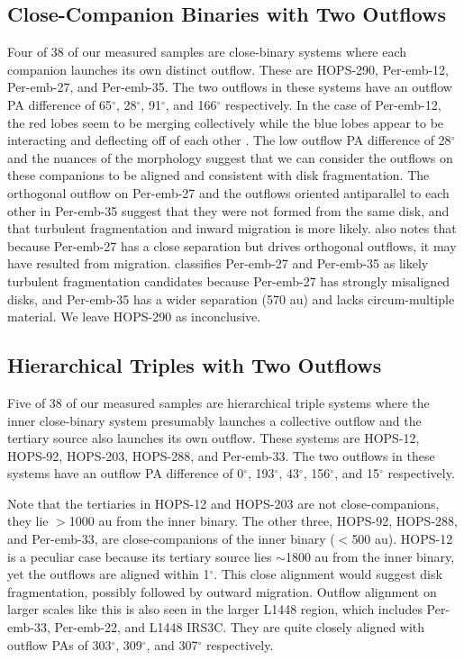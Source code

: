\documentclass[linenumbers,twocolumn, twocolappendix]{aastex631}
\begin{document}
\subsection{Close-Companion Binaries with Two Outflows} \label{sec:dis:binaries-two-outflows}
Four of 38 of our measured samples are close-binary systems where each companion launches its own distinct outflow. These are HOPS-290, Per-emb-12, Per-emb-27, and Per-emb-35. The two outflows in these systems have an outflow PA difference of 65$^\circ$, 28$^\circ$, 91$^\circ$, and 166$^\circ$ respectively. In the case of Per-emb-12, the red lobes seem to be merging collectively while the blue lobes appear to be interacting and deflecting off of each other \citep[e.g.,][]{Encalada_2024}. The low outflow PA difference of 28$^\circ$ and the nuances of the morphology suggest that we can consider the outflows on these companions to be aligned and consistent with disk fragmentation. The orthogonal outflow on Per-emb-27 and the outflows oriented antiparallel to each other in Per-emb-35 suggest that they were not formed from the same disk, and that turbulent fragmentation and inward migration is more likely. \cite{Tobin_et_al_2016} also notes that because Per-emb-27 has a close separation but drives orthogonal outflows, it may have resulted from migration. \cite{Reynolds_et_al_2024} classifies Per-emb-27 and Per-emb-35 as likely turbulent fragmentation candidates because Per-emb-27 has strongly misaligned disks, and Per-emb-35 has a wider separation (570 au) and lacks circum-multiple material. We leave HOPS-290 as inconclusive.

\subsection{Hierarchical Triples with Two Outflows} \label{sec:dis:hierarchical-triples}
Five of 38 of our measured samples are hierarchical triple systems where the inner close-binary system presumably launches a collective outflow and the tertiary source also launches its own outflow. These systems are HOPS-12, HOPS-92, HOPS-203, HOPS-288, and Per-emb-33. The two outflows in these systems have an outflow PA difference of 0$^\circ$, 193$^\circ$, 43$^\circ$, 156$^\circ$, and 15$^\circ$ respectively. 

Note that the tertiaries in HOPS-12 and HOPS-203 are not close-companions, they lie $>$1000 au from the inner binary. The other three, HOPS-92, HOPS-288, and Per-emb-33, are close-companions of the inner binary ($<$500 au). HOPS-12 is a peculiar case because its tertiary source lies $\sim$1800 au from the inner binary, yet the outflows are aligned within 1$^\circ$. This close alignment would suggest disk fragmentation, possibly followed by outward migration. Outflow alignment on larger scales like this is also seen in the larger L1448 region, which includes Per-emb-33, Per-emb-22, and L1448 IRS3C. They are quite closely aligned with outflow PAs of 303$^\circ$, 309$^\circ$, and 307$^\circ$ respectively.
\end{document}
